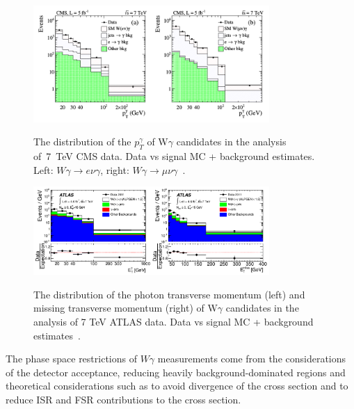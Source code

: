 
\begin{figure}[htb]
  \begin{center}
    {\includegraphics[width=0.80\textwidth]{../figs/WgAbout/Wg7TeV_CMS_ptGamma.png}}
    \caption{The distribution of the $p_T^\gamma$ of W$\gamma$ candidates in the analysis of~7~TeV CMS data. Data vs signal MC + background estimates. Left: $W\gamma\rightarrow e\nu\gamma$, right: $W\gamma\rightarrow \mu\nu\gamma$~\cite{ref_7TeV_CMS}.}
    \label{fig:Wg7TeV_CMS_ptGamma}
  \end{center}
\end{figure}

\begin{figure}[htb]
  \begin{center}
    {\includegraphics[width=0.80\textwidth]{../figs/WgAbout/Wg7TeV_ATLAS_ptGamma.png}}
    \caption{The distribution of the photon transverse momentum (left) and missing transverse momentum (right) of W$\gamma$ candidates in the analysis of 7 TeV ATLAS data. Data vs signal MC + background estimates~\cite{ref_7TeV_ATLAS}. }
    \label{fig:Wg7TeV_ATLAS_ptGamma}
  \end{center}
\end{figure}

The phase space restrictions of $W\gamma$ measurements come from the considerations of the detector acceptance, reducing heavily background-dominated regions and theoretical considerations such as to avoid divergence of the cross section and to reduce ISR and FSR contributions to the cross section.\\

